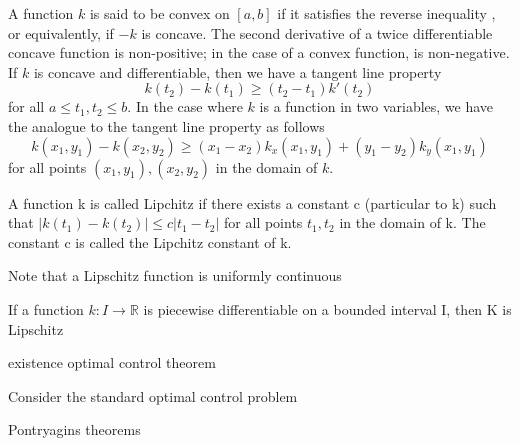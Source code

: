 A function $k$ is said to be convex on $[a,b]$ if it satisfies the reverse 
inequality , or equivalently, if $-k$ is concave. The second derivative of a
twice differentiable concave function is non-positive; in the case of a convex
function, is non-negative. If $k$ is concave and differentiable, then we have 
a tangent line property
	$$
    	k(t_2) - k(t_1) \geq (t_2 - t_1)k'(t_2)
	$$
for all $a \leq t_1,t_2 \leq b$. 
In the case where $k$ is a function in two variables, we have the analogue to
the tangent line property as follows
	$$
    	k(x_1,y_1) - k(x_2,y_2) \geq (x_1 - x_2)k_x(x_1,y_1) + 
        (y_1 - y_2)k_y(x_1,y_1)
	$$
    for all points $(x_1,y_1),(x_2,y_2)$ in the domain of $k$.


\begin{definition}
	A function k is called Lipchitz if there exists a constant c (particular
    to k) such that $|k(t_1) - k(t_2)| \leq c|t_1 - t_2|$ for all points $t_1,
    t_2$ in the domain of k. The constant c is called the Lipchitz constant of 
    k.
\end{definition}

Note that a Lipschitz function is uniformly continuous
\begin{theorem}
	If a function $k : I \rightarrow \mathbb{R}$ is piecewise differentiable on
    a bounded interval I, then K is Lipschitz
\end{theorem}

existence optimal control theorem

\begin{theorem}
    Consider the standard optimal control problem
\end{theorem}
Pontryagins theorems


